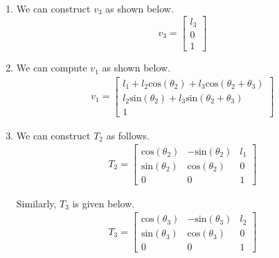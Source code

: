 \documentclass[11pt]{article}
\begin{document}
\begin{enumerate}[leftmargin=0.3in]
\begin{enumerate}
        \item We can construct $\mathit{v}_3$ as shown below. 
            \begin{equation*}
                \mathit{v}_3 = \begin{bmatrix}
                   \mathit{l}_3 \\
                   0 \\ 
                   1
               \end{bmatrix}
            \end{equation*}

        \item We can compute $\mathit{v}_1$ as shown below.
            \begin{align*}
                \mathit{v}_1 = \begin{bmatrix}
                    \mathit{l}_1 + \mathit{l}_2 \text{cos}(\theta_2) + \mathit{l}_3 \text{cos}(\theta_2 + \theta_3) \\
                    \mathit{l}_2 \text{sin}(\theta_2) + \mathit{l}_3 \text{sin}(\theta_2 + \theta_3)\\
                    1
                \end{bmatrix}
            \end{align*}

        \item We can construct $\mathit{T}_2$ as follows.
            \begin{align*}
               \mathit{T}_2 = \begin{bmatrix}
                   \text{cos}(\theta_2) & -\text{sin}(\theta_2) & \mathit{l}_1 \\
                   \text{sin}(\theta_2) & \text{cos}(\theta_2) & 0 \\
                   0 & 0 & 1
               \end{bmatrix}
            \end{align*}
            
            Similarly, $\mathit{T}_3$ is given below.
            \begin{align*}
               \mathit{T}_3 = \begin{bmatrix}
                   \text{cos}(\theta_3) & -\text{sin}(\theta_3) & \mathit{l}_2 \\
                   \text{sin}(\theta_3) & \text{cos}(\theta_3) & 0 \\
                   0 & 0 & 1
               \end{bmatrix}
            \end{align*}


\end{enumerate}
\end{enumerate}
\end{document}
